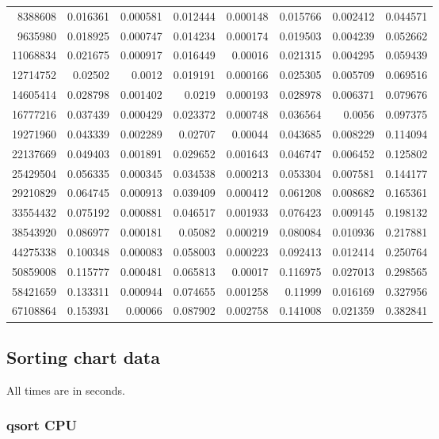 \begin{longtable}{r r r r r r r r}
8388608 & 0.016361 & 0.000581 & 0.012444 & 0.000148 & 0.015766 & 0.002412 & 0.044571 \\
9635980 & 0.018925 & 0.000747 & 0.014234 & 0.000174 & 0.019503 & 0.004239 & 0.052662 \\
11068834 & 0.021675 & 0.000917 & 0.016449 & 0.00016 & 0.021315 & 0.004295 & 0.059439 \\
12714752 & 0.02502 & 0.0012 & 0.019191 & 0.000166 & 0.025305 & 0.005709 & 0.069516 \\
14605414 & 0.028798 & 0.001402 & 0.0219 & 0.000193 & 0.028978 & 0.006371 & 0.079676 \\
16777216 & 0.037439 & 0.000429 & 0.023372 & 0.000748 & 0.036564 & 0.0056 & 0.097375 \\
19271960 & 0.043339 & 0.002289 & 0.02707 & 0.00044 & 0.043685 & 0.008229 & 0.114094 \\
22137669 & 0.049403 & 0.001891 & 0.029652 & 0.001643 & 0.046747 & 0.006452 & 0.125802 \\
25429504 & 0.056335 & 0.000345 & 0.034538 & 0.000213 & 0.053304 & 0.007581 & 0.144177 \\
29210829 & 0.064745 & 0.000913 & 0.039409 & 0.000412 & 0.061208 & 0.008682 & 0.165361 \\
33554432 & 0.075192 & 0.000881 & 0.046517 & 0.001933 & 0.076423 & 0.009145 & 0.198132 \\
38543920 & 0.086977 & 0.000181 & 0.05082 & 0.000219 & 0.080084 & 0.010936 & 0.217881 \\
44275338 & 0.100348 & 0.000083 & 0.058003 & 0.000223 & 0.092413 & 0.012414 & 0.250764 \\
50859008 & 0.115777 & 0.000481 & 0.065813 & 0.00017 & 0.116975 & 0.027013 & 0.298565 \\
58421659 & 0.133311 & 0.000944 & 0.074655 & 0.001258 & 0.11999 & 0.016169 & 0.327956 \\
67108864 & 0.153931 & 0.00066 & 0.087902 & 0.002758 & 0.141008 & 0.021359 & 0.382841 \\
\end{longtable}

\subsection{Sorting chart data}
\label{sec:sort_chart_data}

All times are in seconds.

\subsubsection{qsort CPU}

